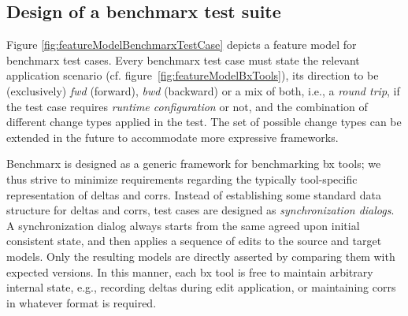 \subsection{Design of a benchmarx test suite}

Figure \ref{fig:featureModelBenchmarxTestCase} depicts a feature model for benchmarx test cases. 
Every benchmarx test case must state the relevant application scenario (cf. figure~\ref{fig:featureModelBxTools}), its direction to be (exclusively) \emph{fwd} (forward), \emph{bwd} (backward) or a mix of both, i.e., a \emph{round trip}, if the test case requires \emph{runtime configuration} or not, and the combination of different change types applied in the test. 
The set of possible change types can be extended in the future to accommodate more expressive frameworks. 

Benchmarx is designed as a generic framework for benchmarking bx tools; we thus strive to minimize requirements regarding the typically tool-specific representation of deltas and corrs. 
Instead of establishing some standard data structure for deltas and corrs, test cases are designed as \emph{synchronization dialogs}. 
A synchronization dialog always starts from the same agreed upon initial consistent state, and then applies a sequence of edits to the source and target models. 
Only the resulting models are directly asserted by comparing them with expected versions.
In this manner, each bx tool is free to maintain arbitrary internal state, e.g., recording deltas during edit application, or maintaining corrs in whatever format is required.

